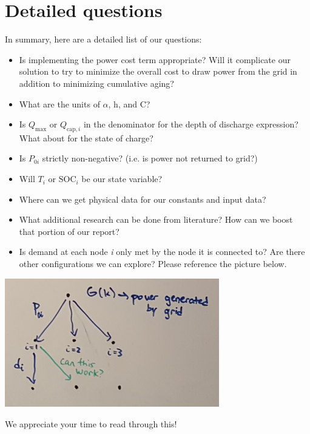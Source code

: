 \documentclass{article}
\begin{document}
\section{Detailed questions}
In summary, here are a detailed list of our questions:
\begin{itemize}
	\item Is implementing the power cost term appropriate? Will it complicate our solution to try to minimize the overall cost to draw power from the grid in addition to minimizing cumulative aging?
	\item What are the units of $\alpha$, h, and C?
	\item Is $Q_{\text{max}}$ or $Q_{\text{cap},i}$ in the denominator for the depth of discharge expression? What about for the state of charge?
	\item Is $P_{0i}$ strictly non-negative? (i.e. is power not returned to grid?)
	\item Will $T_i$ or $\text{SOC}_i$ be our state variable?
	\item Where can we get physical data for our constants and input data?
	\item What additional research can be done from literature? How can we boost that portion of our report?
	\item Is demand at each node \textit{i} only met by the node it is connected to? Are there other configurations we can explore? Please reference the picture below.
\end{itemize}
\begin{center}
	\includegraphics[width=0.7\textwidth]{grid.jpg}
\end{center}
We appreciate your time to read through this!
\end{document}
